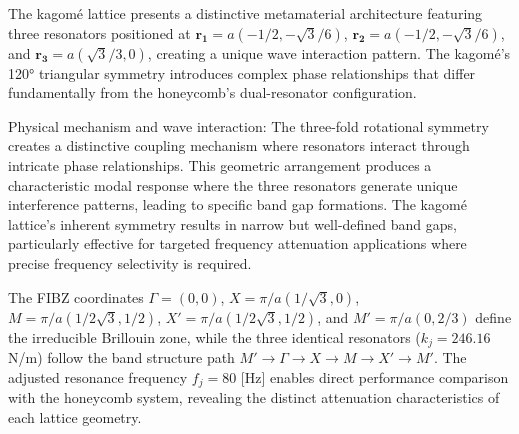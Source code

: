 \documentclass[review,numbers,sort&compress]{elsarticle}
\begin{document}
The kagomé lattice presents a distinctive metamaterial architecture featuring three resonators positioned at \( \mathbf{r_1} = a(-1/2, -\sqrt{3}/6) \), \( \mathbf{r_2} = a(-1/2, -\sqrt{3}/6) \), and \( \mathbf{r_3} = a(\sqrt{3}/3, 0) \), creating a unique wave interaction pattern. The kagomé's 120° triangular symmetry introduces complex phase relationships that differ fundamentally from the honeycomb's dual-resonator configuration.

Physical mechanism and wave interaction: The three-fold rotational symmetry creates a distinctive coupling mechanism where resonators interact through intricate phase relationships. This geometric arrangement produces a characteristic modal response where the three resonators generate unique interference patterns, leading to specific band gap formations. The kagomé lattice's inherent symmetry results in narrow but well-defined band gaps, particularly effective for targeted frequency attenuation applications where precise frequency selectivity is required.

The FIBZ coordinates \( \Gamma = (0,0) \), \( X = \pi/a(1/\sqrt{3},0) \), \( M = \pi/a(1/2\sqrt{3},1/2) \), \( X' = \pi/a(1/2\sqrt{3},1/2) \), and \( M' = \pi/a(0,2/3) \) define the irreducible Brillouin zone, while the three identical resonators (\( k_j = 246.16 \) N/m) follow the band structure path \( M' \longrightarrow \Gamma \longrightarrow X \longrightarrow M \longrightarrow X' \longrightarrow M' \). The adjusted resonance frequency \( f_j = 80 \) [Hz] enables direct performance comparison with the honeycomb system, revealing the distinct attenuation characteristics of each lattice geometry.
\end{document}
